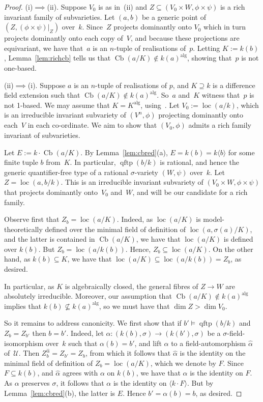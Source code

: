 \documentclass[\DocOpts]{amsart}
\theoremstyle{definition}
\def\cb{\operatorname{Cb}}
\def\qftp{\operatorname{qftp}}
\def\alg{{\operatorname{alg}}}
\def\loc{\operatorname{loc}}
\def\U{\mathcal{U}}
\newcommand{\<}{\langle}
\renewcommand{\>}{\rangle}
\begin{document}
\begin{proof}
(i)$\implies$(ii).
Suppose $V_0$ is as in~(ii) and $Z\subseteq(V_0\times W,\phi\times\psi)$ is a rich invariant family of subvarieties.
Let $(a,b)$ be a generic point of $(Z,(\phi\times\psi)|_Z)$ over~$k$.
Since~$Z$ projects dominantly onto $V_0$ which in turn projects dominantly onto each copy of~$V$, and because these projections are equivariant, we have that~$a$ is an $n$-tuple of realisations of~$p$.
Letting $K:=k(b)$, Lemma~\ref{lem:richcb} tells us that $\cb(a/K)\notin k(a)^{\alg}$, showing that~$p$ is not one-based.

(ii)$\implies$(i).
Suppose $a$ is an $n$-tuple of realisations of $p$, and $K\supseteq k$ is a difference field extension such that $\cb(a/K)\notin k(a)^{\alg}$.
So~$a$ and~$K$ witness that~$p$ is not 1-based.
We may assume that $K=K^{\alg}$, using~\cite[Lemma~2.5(a)]{qfint}.
Let $V_0:=\loc(a/k)$, which is an irreducible invariant subvariety of $(V^n,\phi)$ projecting dominantly onto each~$V$ in each co-ordinate.
We aim to show that $(V_0,\phi)$ admits a rich family invariant of subvarieties.

Let $E:=k\cdot\cb(a/K)$.
By Lemma~\ref{lem:cbred}(a),
$E=k(b)=k\langle b\rangle$ for some finite tuple $b$ from~$K$.
In particular, $\qftp(b/k)$ is rational, and hence the generic quantifier-free type of a rational $\sigma$-variety $(W,\psi)$ over~$k$.
Let $Z=\loc(a,b/k)$.
This is an irreducible invariant subvariety of $(V_0\times W,\phi\times\psi)$ that projects dominantly onto~$V_0$ and~$W$, and will be our candidate for a rich family.

Observe first that $Z_b=\loc(a/K)$.
Indeed, as $\loc(a/K)$ is model-theoretically defined over the minimal field of definition of $\loc(a,\sigma(a)/K)$, and the latter is contained in $\cb(a/K)$, we have that $\loc(a/K)$ is defined over $k(b)$.
But $Z_b=\loc(a/k(b))$.
Hence, $Z_b\subseteq\loc(a/K)$.
On the other hand, as $k(b)\subseteq K$, we have that
$\loc(a/K)\subseteq\loc(a/k(b))=Z_b$, as desired.

In particular, as $K$ is algebraically closed, the general fibres of $Z\to W$ are absolutely irreducible.
Moreover, our assumption that $\cb(a/K)\notin k(a)^{\alg}$ implies that $k(b)\not\subseteq k(a)^{\alg}$, so we must have that $\dim Z>\dim V_0$.

So it remains to address canonicity. 
We first show that if $b'\models\qftp(b/k)$ and $Z_b=Z_{b'}$ then $b=b'$.
Indeed, let $\alpha:(k(b),\sigma)\to(k(b'),\sigma)$ be a $\sigma$-field-isomorphism over~$k$ such that $\alpha(b)=b'$, and
lift $\alpha$ to a field-automorphism $\widehat\alpha$ of~$\U$.
Then $Z_b^{\widehat\alpha}=Z_{b'}=Z_b$, from which it follows that  $\widehat\alpha$ is the identity on the minimal field of definition of $Z_b=\loc(a/K)$, which we denote by $F$.
Since $F\subseteq k(b)$, and $\widehat\alpha$ agrees with $\alpha$ on $k(b)$, we have that $\alpha$ is the identity on $F$.
As $\alpha$ preserves $\sigma$, it follows that $\alpha$ is the identity on $\langle k\cdot F\rangle$.
But by Lemma~\ref{lem:cbred}(b), the latter is $E$.
Hence $b'=\alpha(b)=b$, as desired.


\end{proof}
\end{document}
